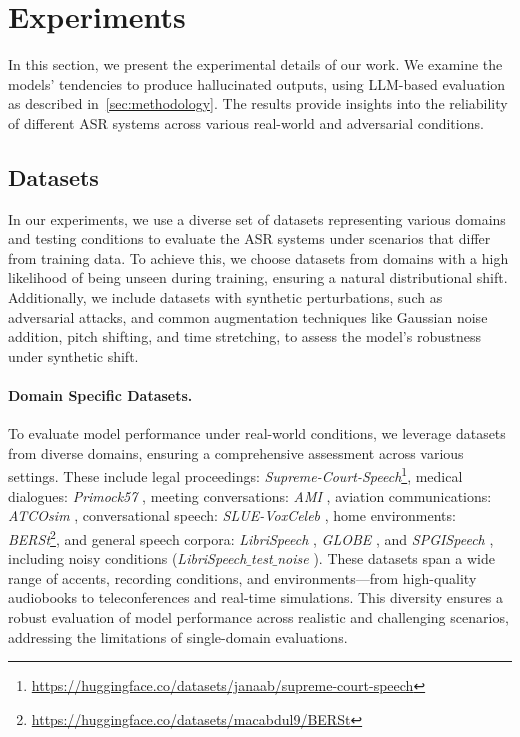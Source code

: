 \section{Experiments}\label{sec:experiments}
In this section, we present the experimental details of our work. We examine the models' tendencies to produce hallucinated outputs, using LLM-based evaluation as described in~\ref{sec:methodology}. The results provide insights into the reliability of different ASR systems across various real-world and adversarial conditions.

\subsection{Datasets}\label{subsec:datasets}
In our experiments, we use a diverse set of datasets representing various domains and testing conditions to evaluate the ASR systems under scenarios that differ from training data. To achieve this, we choose datasets from domains with a high likelihood of being unseen during training, ensuring a natural distributional shift. Additionally, we include datasets with synthetic perturbations, such as adversarial attacks, and common augmentation techniques like Gaussian noise addition, pitch shifting, and time stretching, to assess the model's robustness under synthetic shift.


\paragraph{Domain Specific Datasets.} To evaluate model performance under real-world conditions, we leverage datasets from diverse domains, ensuring a comprehensive assessment across various settings. These include legal proceedings: \emph{Supreme-Court-Speech}\footnote{\url{https://huggingface.co/datasets/janaab/supreme-court-speech}}, medical dialogues: \emph{Primock57} \cite{papadopoulos-korfiatis-etal-2022-primock57}, meeting conversations: \emph{AMI} \cite{ami_corpus}, aviation communications: \emph{ATCOsim} \cite{hofbauer-etal-2008-atcosim}, conversational speech: \emph{SLUE-VoxCeleb} \cite{shon2022slue}, home environments: \emph{BERSt}\footnote{\url{https://huggingface.co/datasets/macabdul9/BERSt}}, and general speech corpora: \emph{LibriSpeech} \cite{panayotov2015librispeech}, \emph{GLOBE} \cite{wang2024globe}, and \emph{SPGISpeech} \cite{kensho2021spgispeech}, including noisy conditions (\emph{LibriSpeech$\_$test$\_$noise} \cite{panayotov2015librispeech}). These datasets span a wide range of accents, recording conditions, and environments—from high-quality audiobooks to teleconferences and real-time simulations. This diversity ensures a robust evaluation of model performance across realistic and challenging scenarios, addressing the limitations of single-domain evaluations.

